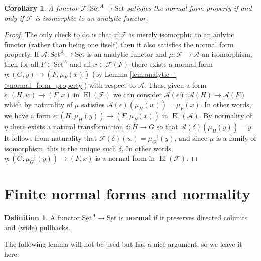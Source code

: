 \documentclass[12pt]{article}
\theoremstyle{plain}
\newtheorem{cor}[thm]{Corollary}
\theoremstyle{definition}
\newtheorem{defn}[thm]{Definition} %
\newcommand{\scr}[1]{\mathscr{#1}}
\newcommand{\lto}{\longrightarrow}
\newcommand{\set}{\operatorname{\underline{Set}}}
\begin{document}
	\begin{cor}
		A functor $\scr{F}: \set^A \lto \set$ satisfies the normal form property if and only if $\scr{F}$ is isomorphic to an analytic functor.
		\end{cor}
	\begin{proof}
		The only check to do is that if $\scr{F}$ is merely isomorphic to an anlytic functor (rather than being one itself) then it also satisfies the normal form property. If $\scr{A}: \set^A \lto \set$ is an analytic functor and $\mu: \scr{F} \lto \scr{A}$ an isomorphism, then for all $F \in \set^A$ and all $x \in \scr{F}(F)$ there exists a normal form $\eta: (G, y) \lto (F, \mu_F(x))$ (by Lemma \ref{lem:analytic--->normal_form_property}) with respect to $\scr{A}$. Thus, given a form $\epsilon: (H, w) \lto (F, x)$ in $\operatorname{El}(\scr{F})$ we can consider $\scr{A}(\epsilon): \scr{A}(H) \lto \scr{A}(F)$ which by naturality of $\mu$ satisfies $\scr{A}(\epsilon)(\mu_H(w)) = \mu_F(x)$. In other words, we have a form $\epsilon: (H, \mu_H(y)) \lto (F, \mu_F(x))$ in $\operatorname{El}(\scr{A})$. By normality of $\eta$ there exists a natural transformation $\delta: H \lto G$ so that $\scr{A}(\delta)(\mu_H(y)) = y$. It follows from naturality that $\scr{F}(\delta)(w) = \mu_G^{-1}(y)$, and since $\mu$ is a family of isomorphism, this is the unique such $\delta$. In other words, $\eta: (G, \mu_G^{-1}(y)) \lto (F, x)$ is a normal form in $\operatorname{El}(\scr{F})$.
		\end{proof}
	
	\section{Finite normal forms and normality}
	\begin{defn}
		A functor $\set^A \lto \set$ is \textbf{normal} if it preserves directed colimits and (wide) pullbacks.
		\end{defn}
	
	The following lemma will not be used but has a nice argument, so we leave it here.
	
\end{document}
